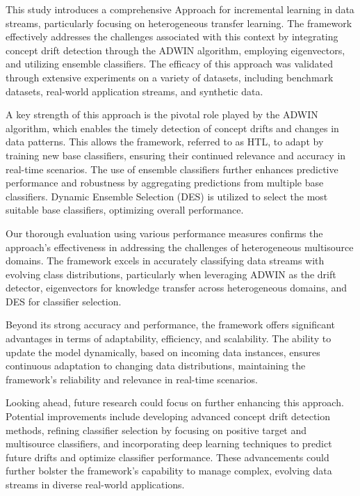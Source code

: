 This study introduces a comprehensive Approach for incremental learning in data streams, particularly focusing on heterogeneous transfer learning. The framework effectively addresses the challenges associated with this context by integrating concept drift detection through the ADWIN algorithm, employing eigenvectors, and utilizing ensemble classifiers. The efficacy of this approach was validated through extensive experiments on a variety of datasets, including benchmark datasets, real-world application streams, and synthetic data.

A key strength of this approach is the pivotal role played by the ADWIN algorithm, which enables the timely detection of concept drifts and changes in data patterns. This allows the framework, referred to as HTL, to adapt by training new base classifiers, ensuring their continued relevance and accuracy in real-time scenarios. The use of ensemble classifiers further enhances predictive performance and robustness by aggregating predictions from multiple base classifiers. Dynamic Ensemble Selection (DES) is utilized to select the most suitable base classifiers, optimizing overall performance.

Our thorough evaluation using various performance measures confirms the approach’s effectiveness in addressing the challenges of heterogeneous multisource domains. The framework excels in accurately classifying data streams with evolving class distributions, particularly when leveraging ADWIN as the drift detector, eigenvectors for knowledge transfer across heterogeneous domains, and DES for classifier selection.

Beyond its strong accuracy and performance, the framework offers significant advantages in terms of adaptability, efficiency, and scalability. The ability to update the model dynamically, based on incoming data instances, ensures continuous adaptation to changing data distributions, maintaining the framework's reliability and relevance in real-time scenarios.

Looking ahead, future research could focus on further enhancing this approach. Potential improvements include developing advanced concept drift detection methods, refining classifier selection by focusing on positive target and multisource classifiers, and incorporating deep learning techniques to predict future drifts and optimize classifier performance. These advancements could further bolster the framework’s capability to manage complex, evolving data streams in diverse real-world applications.